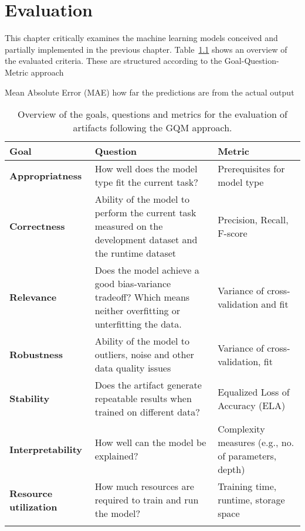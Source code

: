 \chapter{Evaluation}
This chapter critically examines the machine learning models conceived and partially implemented in the previous chapter.
Table~\ref*{tab:evaluation_criteria} shows an overview of the evaluated criteria. These are structured according to the Goal-Question-Metric approach

Mean Absolute Error (MAE) how far the predictions are from the actual output


\begin{longtable}{|l|p{7cm}|p{3cm}|}
    \hline
    \textbf{Goal}                 & \textbf{Question}                                                                                               & \textbf{Metric}                                      \\

    \hline
    \textbf{Appropriatness}       & How well does the model type fit the current task?                                                              & Prerequisites for model type                         \\
    \hline
    \textbf{Correctness}          & Ability of the model to perform the current task measured on the development dataset and the runtime dataset    &
    Precision, Recall, F-score                                                                                                                                                                             \\
    \hline
    \textbf{Relevance}            & Does the model achieve a good bias-variance tradeoff? Which means neither overfitting or unterfitting the data. & Variance of cross-validation and fit                 \\
    \hline
    \textbf{Robustness}           & Ability of the model to outliers, noise and other data quality issues                                           & Variance of cross-validation, fit                    \\
    \hline
    \textbf{Stability}            & Does the artifact generate repeatable results when trained on different data?                                   & Equalized Loss of Accuracy (ELA)                     \\
    \hline
    \textbf{Interpretability}     & How well can the model be explained?                                                                            & Complexity measures (e.g., no. of parameters, depth) \\
    \hline
    \textbf{Resource utilization} & How much resources are required to train and run the model?                                                     & Training time, runtime, storage space                \\
    \hline
    \caption{Overview of the goals, questions and metrics for the evaluation of artifacts following the \ac{GQM} approach.}
    \label{tab:evaluation_criteria}
\end{longtable}


